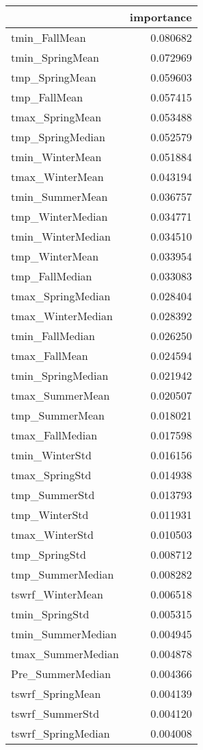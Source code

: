 \begin{tabular}{lr}
\toprule
 & importance \\
\midrule
tmin_FallMean & 0.080682 \\
tmin_SpringMean & 0.072969 \\
tmp_SpringMean & 0.059603 \\
tmp_FallMean & 0.057415 \\
tmax_SpringMean & 0.053488 \\
tmp_SpringMedian & 0.052579 \\
tmin_WinterMean & 0.051884 \\
tmax_WinterMean & 0.043194 \\
tmin_SummerMean & 0.036757 \\
tmp_WinterMedian & 0.034771 \\
tmin_WinterMedian & 0.034510 \\
tmp_WinterMean & 0.033954 \\
tmp_FallMedian & 0.033083 \\
tmax_SpringMedian & 0.028404 \\
tmax_WinterMedian & 0.028392 \\
tmin_FallMedian & 0.026250 \\
tmax_FallMean & 0.024594 \\
tmin_SpringMedian & 0.021942 \\
tmax_SummerMean & 0.020507 \\
tmp_SummerMean & 0.018021 \\
tmax_FallMedian & 0.017598 \\
tmin_WinterStd & 0.016156 \\
tmax_SpringStd & 0.014938 \\
tmp_SummerStd & 0.013793 \\
tmp_WinterStd & 0.011931 \\
tmax_WinterStd & 0.010503 \\
tmp_SpringStd & 0.008712 \\
tmp_SummerMedian & 0.008282 \\
tswrf_WinterMean & 0.006518 \\
tmin_SpringStd & 0.005315 \\
tmin_SummerMedian & 0.004945 \\
tmax_SummerMedian & 0.004878 \\
Pre_SummerMedian & 0.004366 \\
tswrf_SpringMean & 0.004139 \\
tswrf_SummerStd & 0.004120 \\
tswrf_SpringMedian & 0.004008 \\

\end{tabular}
